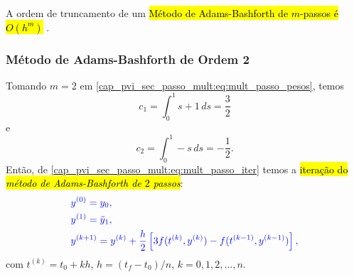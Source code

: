 \begin{obs}
  A ordem de truncamento de um \hl{Método de Adams-Bashforth de $m$-passos é $O(h^m)$} \cite{Burden2016a}.
\end{obs}

\subsubsection{Método de Adams-Bashforth de Ordem 2}

Tomando $m=2$ em \eqref{cap_pvi_sec_passo_mult:eq:mult_passo_pesos}, temos
\begin{equation}
  c_1 = \int_0^1 s+1\,ds = \frac{3}{2}
\end{equation}
e
\begin{equation}
  c_2 = \int_0^1 -s\,ds = -\frac{1}{2}.
\end{equation}
Então, de \eqref{cap_pvi_sec_passo_mult:eq:mult_passo_iter} temos a \hl{iteração do \emph{método de Adams-Bashforth de $2$ passos}}:
\begin{equation}\label{cap_pvi_sec_passo_mult:eq:iter_ab2}\color{blue}\begin{aligned}
    &y^{(0)} = y_0,\\
    &y^{(1)} = \tilde{y}_1,\\
    &y^{(k+1)} = y^{(k)} + \frac{h}{2}\left[3f(t^{(k)},y^{(k)}) - f(t^{(k-1)},y^{(k-1)})\right],
  \end{aligned}
\end{equation}
com $t^{(k)} = t_0 + kh$, $h = (t_f - t_0)/n$, $k = 0, 1, 2, \dotsc, n$.

